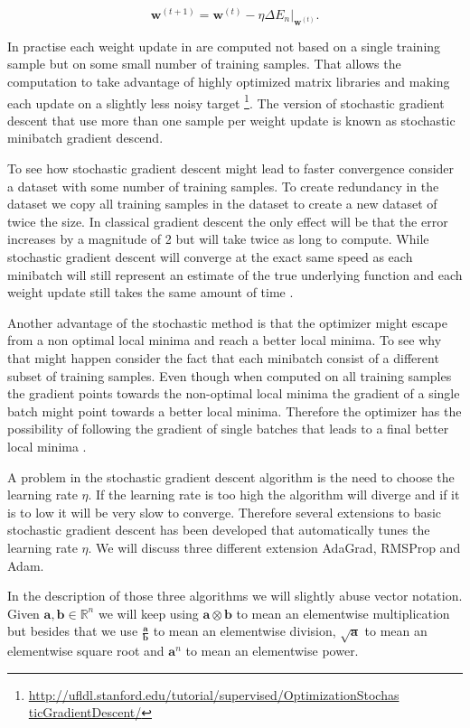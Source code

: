 \begin{equation}
    \mathbf{w}^{(t+1)} =
        \mathbf{\mathbf{w}}^{(t)} -
        \eta\Delta E_n|_{\mathbf{w}^{(t)}}.
\end{equation}

In practise each weight update in are computed not based on a single
training sample but on some small number of training samples. That
allows the computation to take advantage of highly optimized matrix
libraries and making each update on a slightly less noisy target
\footnote{\url{http://ufldl.stanford.edu/tutorial/supervised/OptimizationStochas
ticGradientDescent/}}. The version of stochastic gradient descent that use more
than one sample per weight update is known as stochastic minibatch gradient
descend.

To see how stochastic gradient descent might lead to faster convergence consider
a dataset with some number of training samples. To create redundancy in the
dataset we copy all training samples in the dataset to create a new dataset of
twice the size. In classical gradient descent the only effect will be that the
error increases by a magnitude of 2 but will take twice as long to compute.
While stochastic gradient descent will converge at the exact same speed as each
minibatch will still represent an estimate of the true underlying function and
each weight update still takes the same amount of time \citep{Bishop}.

Another advantage of the stochastic method is that the optimizer might escape
from a non optimal local minima and reach a better local minima. To see why that
might happen consider the fact that each minibatch consist of a different subset
of training samples. Even though when computed on all training samples the
gradient points towards the non-optimal local minima the gradient of a single
batch might point towards a better local minima. Therefore the optimizer has the
possibility of following the gradient of single batches that leads to a final
better local minima \citep{Bishop}.

A problem in the stochastic gradient descent algorithm is the need to choose
the learning rate $\eta$. If the learning rate is too high the algorithm
will diverge and if it is to low it will be very slow to converge. Therefore
several extensions to basic stochastic gradient descent has been developed that
automatically tunes the learning rate $\eta$. We will discuss three different
extension \gls{AdaGrad}, \gls{RMSProp} and \gls{Adam}.

In the description of those three algorithms we will slightly abuse vector
notation. Given $\mathbf{a}, \mathbf{b} \in \mathbb{R}^n$ we will keep using
$\mathbf{a} \otimes \mathbf{b}$ to mean an elementwise multiplication but
besides that we use $\frac{\mathbf{a}}{\mathbf{b}}$ to mean an elementwise
division, $\sqrt{\mathbf{a}}$ to mean an elementwise square root and
$\mathbf{a}^n$ to mean an elementwise power.

